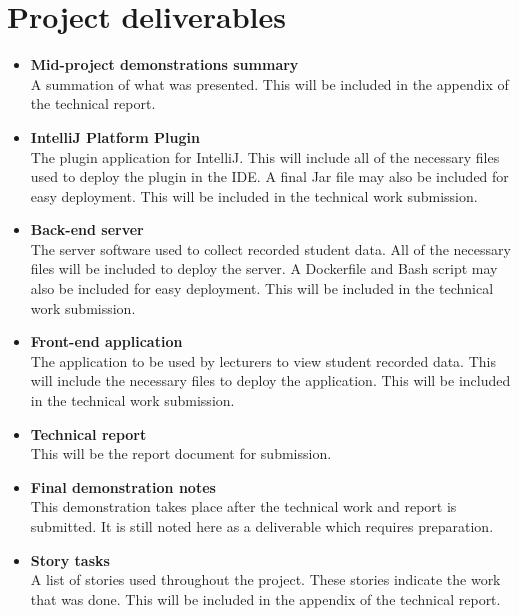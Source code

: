 \section{Project deliverables}

\begin{itemize}
  \item \textbf{Mid-project demonstrations summary}\\A summation of what was presented. This will be included in the appendix of the technical report.
  \item \textbf{IntelliJ Platform Plugin}\\The plugin application for IntelliJ. This will include all of the necessary files used to deploy the plugin in the IDE. A final Jar file may also be included for easy deployment. This will be included in the technical work submission.
  \item \textbf{Back-end server}\\The server software used to collect recorded student data. All of the necessary files will be included to deploy the server. A Dockerfile and Bash script may also be included for easy deployment. This will be included in the technical work submission.
  \item \textbf{Front-end application}\\The application to be used by lecturers to view student recorded data. This will include the necessary files to deploy the application. This will be included in the technical work submission.
  \item \textbf{Technical report}\\This will be the report document for submission.
  \item \textbf{Final demonstration notes}\\This demonstration takes place after the technical work and report is submitted. It is still noted here as a deliverable which requires preparation.
  \item \textbf{Story tasks}\\A list of stories used throughout the project. These stories indicate the work that was done. This will be included in the appendix of the technical report.
\end{itemize}
